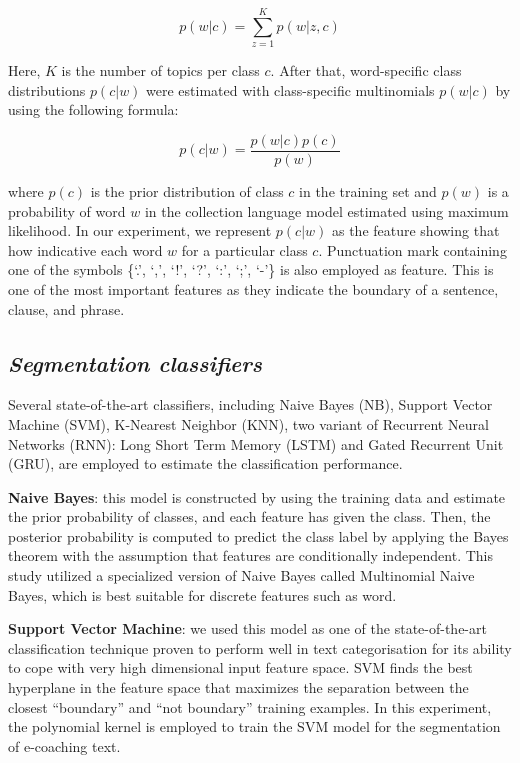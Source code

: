 \documentclass{amia}
\begin{document}
$$p(w|c) = {\sum_{z=1}^{K}{p(w|z, c)}}$$

Here, $K$ is the number of topics per class $c$. After that, word-specific class distributions $p(c|w)$ were estimated with class-specific multinomials $p(w|c)$ by using the following formula: 

$$p(c|w) = \frac{p(w|c)p(c)}{p(w)}$$

where $p(c)$ is the prior distribution of class $c$ in the training set and $p(w)$ is a probability of word $w$ in the collection language model estimated using maximum likelihood. In our experiment, we represent $p(c|w)$ as the feature showing that how indicative each word $w$ for a particular class $c$. Punctuation mark containing one of the symbols \{`.', `,', `!', `?', `:', `;', `-'\} is also employed as feature. This is one of the most important features as they indicate the boundary of a sentence, clause, and phrase.   

\subsection*{\textit{Segmentation classifiers}}
Several state-of-the-art classifiers, including Naive Bayes (NB)\cite{pedregosa2011scikit}, Support Vector Machine (SVM)\cite{chang2011libsvm}, K-Nearest Neighbor (KNN)\cite{pedregosa2011scikit}, two variant of Recurrent Neural Networks (RNN)\cite{bengio1993problem}: Long Short Term Memory (LSTM)\cite{hochreiter1997long} and Gated Recurrent Unit (GRU)\cite{cho2014properties}, are employed to estimate the classification performance. 

\textbf{Naive Bayes}: this model is constructed by using the training data and estimate the prior probability of classes, and each feature has given the class. Then, the posterior probability is computed to predict the class label by applying the Bayes theorem with the assumption that features are conditionally independent. This study utilized a specialized version of Naive Bayes called Multinomial Naive Bayes, which is best suitable for discrete features such as word.

\textbf{Support Vector Machine}: we used this model as one of the state-of-the-art classification technique proven to perform well in text categorisation\cite{joachims1998text} for its ability to cope with very high dimensional input feature space. SVM finds the best hyperplane in the feature space that maximizes the separation between the closest ``boundary'' and ``not boundary'' training examples. In this experiment, the polynomial kernel is employed to train the SVM model for the segmentation of e-coaching text.   
\end{document}
